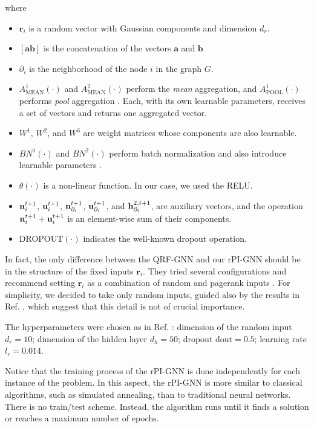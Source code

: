 \documentclass{article}
\begin{document}
where 
\begin{itemize}
\item $\textbf{r}_i$ is a random vector with Gaussian components and dimension $d_r$.
 \item $[\textbf{a} \textbf{b}]$ is the concatenation of the vectors $\textbf{a}$ and $\textbf{b}$
 \item $\partial_i$ is the neighborhood of the node $i$ in the graph $G$.
 \item $A^{1}_{\text{MEAN}}(\cdot)$ and $A^{2}_{\text{MEAN}}(\cdot)$ perform the \textit{mean} aggregation, and $A^{1}_{\text{POOL}}(\cdot)$ performs \textit{pool} aggregation \cite{Hamilton_GraphSAGE_2017}. Each, with its own learnable parameters, receives a set of vectors and returns one aggregated vector.
 \item $W^{1}$, $W^{2}$, and $W^{3}$ are weight matrices whose components are also learnable.
 \item $BN^{1}(\cdot)$ and $BN^{2}(\cdot)$ perform batch normalization and also introduce learnable parameters \cite{IoffeBatchNorm2015}.
 \item $\theta(\cdot)$ is a non-linear function. In our case, we used the RELU.
 \item ${\bf n}_i^{t+1}$, ${\bf u}_i^{t+1}$, ${\bf n}_{\partial_i}^{t+1}$, ${\bf u}_{\partial_i}^{t+1}$, and ${\bf h}_{\partial_i}^{2, t+1}$,  are auxiliary vectors, and the operation ${\bf n}_i^{t+1} + {\bf u}_i^{t+1}$ is an element-wise sum of their components.
 \item DROPOUT$(\cdot)$ indicates the well-known dropout operation.
\end{itemize}


In fact, the only difference between the QRF-GNN and our rPI-GNN should be in the structure of the fixed inputs $\textbf{r}_i$. They tried several configurations and recommend setting $\textbf{r}_i$ as a combination of random and pagerank inputs \cite{pugacheva_QRF_PIGNN_2024}. For simplicity, we decided to take only random inputs, guided also by the results in Ref. \cite{pugacheva_QRF_PIGNN_2024}, which suggest that this detail is not of crucial importance. 
 
The hyperparameters were chosen as in Ref. \cite{pugacheva_QRF_PIGNN_2024}: dimension of the random input $d_r=10$; dimension of the hidden layer $d_h=50$; dropout $\text{dout}=0.5$; learning rate $l_r=0.014$.
 
Notice that the training process of the rPI-GNN is done independently for each instance of the problem. In this aspect, the rPI-GNN is more similar to classical algorithms, such as simulated annealing, than to traditional neural networks. There is no train/test scheme. Instead, the algorithm runs until it finds a solution or reaches a maximum number of epochs.
\end{document}
